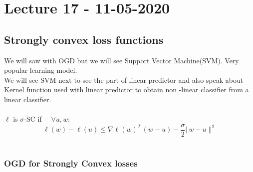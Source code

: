 \documentclass[../main.tex]{subfiles}
\begin{document}
\chapter{Lecture 17 - 11-05-2020}

\section{Strongly convex loss functions}
We will saw with OGD but we will see Support Vector Machine(SVM). Very popular learning model.
\\
We will see SVM next to see the part of linear predictor and also speak about Kernel function used with linear predictor to obtain non -linear classifier from a linear classifier.
\\\\
$\ell$ is $\sigma$-SC if $ \quad \forall u,w$:
$$\ell(w) -\ell(u) \leq \nabla \ell(w)^T \, (w-u)- \frac{\sigma}{2} |\ w -u \|^2$$
\\
\subsection{OGD for Strongly Convex losses}
\end{document}
